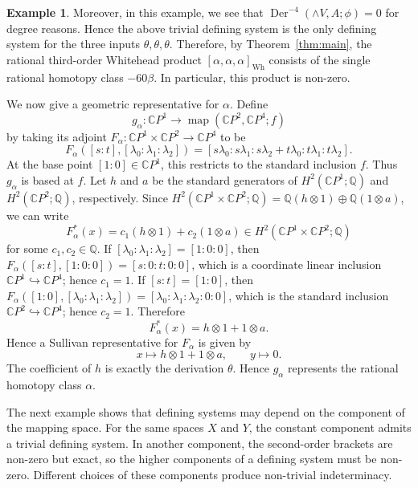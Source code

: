 \documentclass[a4paper,10pt]{amsart}
\theoremstyle{definition}
\newtheorem{ex}[thm]{Example}
\theoremstyle{remark}
\newcommand{\map}{\operatorname{map}}
\newcommand{\Der}{\operatorname{Der}}
\numberwithin{equation}{section}
\begin{document}
\begin{ex}
Moreover, in this example, we see that $\Der^{-4}(\wedge V,A;\phi)=0$ for degree reasons.
Hence the above trivial defining system is the only defining system for the three
inputs $\theta,\theta,\theta$.
Therefore, by Theorem~\ref{thm:main}, the rational third-order Whitehead product
$[\alpha,\alpha,\alpha]_{\mathrm{Wh}}$ consists of the single rational homotopy
class $-60\beta$.
In particular, this product is non-zero.

We now give a geometric representative for $\alpha$.
Define
\[
g_\alpha:\mathbb CP^1
\longrightarrow
\map(\mathbb CP^2,\mathbb CP^4;f)
\]
by taking its adjoint $F_\alpha:\mathbb{C}P^1\times \mathbb{C}P^2 \to \mathbb{C}P^4$
to be
\[
F_\alpha([s:t],[\lambda_0:\lambda_1:\lambda_2])
=
[s\lambda_0 : s\lambda_1: s\lambda_2+t\lambda_0 : t\lambda_1 : t\lambda_2].
\]
At the base point $[1:0]\in \mathbb{C}P^1$, this restricts to the standard
inclusion $f$. Thus $g_\alpha$ is based at $f$.
Let $h$ and $a$ be the standard generators of
$H^2(\mathbb{C}P^1;\mathbb{Q})$ and
$H^2(\mathbb{C}P^2;\mathbb{Q})$, respectively.
Since
$H^2(\mathbb{C}P^1\times \mathbb{C}P^2;\mathbb{Q})= \mathbb{Q}(h\otimes 1)\oplus \mathbb{Q}(1\otimes a)$,
we can write
\[
F_\alpha^*(x)=c_1(h\otimes 1)+c_2(1\otimes a) \in H^2(\mathbb{C}P^1\times \mathbb{C}P^2;\mathbb{Q})
\]
for some $c_1,c_2\in\mathbb{Q}$.
If $[\lambda_0:\lambda_1:\lambda_2]=[1:0:0]$, then
$F_\alpha([s:t],[1:0:0])=[s:0:t:0:0]$,
which is a coordinate linear inclusion
$\mathbb{C}P^1\hookrightarrow \mathbb{C}P^4$; hence $c_1=1$.
If $[s:t]=[1:0]$, then
$
F_\alpha([1:0],[\lambda_0:\lambda_1:\lambda_2])
=
[\lambda_0:\lambda_1:\lambda_2:0:0]$, which is the standard inclusion
$\mathbb{C}P^2\hookrightarrow \mathbb{C}P^4$; hence $c_2=1$.
Therefore
\[
F_\alpha^*(x)=h\otimes 1+1\otimes a.
\]
Hence a Sullivan representative for $F_\alpha$ is given by
\[
x\longmapsto h\otimes 1+1\otimes a,\qquad y\longmapsto 0.
\]
The coefficient of $h$ is exactly the derivation $\theta$. Hence $g_\alpha$
represents the rational homotopy class $\alpha$.
\end{ex}



The next example shows that defining systems may depend on the component of
the mapping space. For the same spaces $X$ and $Y$, the constant component
admits a trivial defining system. In another component, the second-order
brackets are non-zero but exact, so the higher components of a defining system
must be non-zero. Different choices of these components produce non-trivial
indeterminacy.
\end{document}
